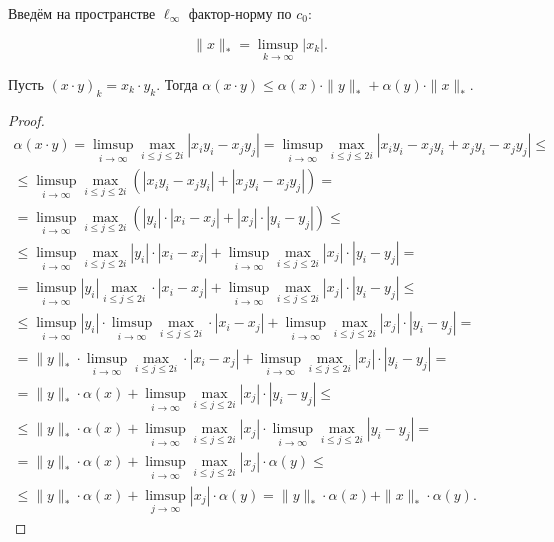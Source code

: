 Введём на пространстве $\ell_\infty$ фактор-норму по $c_0$:

\begin{equation}
	\|x\|_* = \limsup_{k\to\infty} |x_k|
	.
\end{equation}

\begin{theorem}
	\label{thm:alpha_xy}
	Пусть $(x\cdot y)_k = x_k\cdot y_k$.
	Тогда
	$\alpha(x\cdot y)\leq \alpha(x)\cdot \|y\|_* + \alpha(y)\cdot \|x\|_*$.
\end{theorem}

\begin{proof}
	\begin{multline}
		\alpha(x\cdot y)
		=
		\limsup_{i\to\infty} \max_{i\leq j \leq 2i} |x_i y_i - x_j y_j|
		=
		\limsup_{i\to\infty} \max_{i\leq j \leq 2i} |x_i y_i - x_j y_i + x_j y_i - x_j y_j|
		\leq
		\\ \leq
		\limsup_{i\to\infty} \max_{i\leq j \leq 2i} \left(|x_i y_i - x_j y_i| + |x_j y_i - x_j y_j| \right)
		=
		\\=
		\limsup_{i\to\infty} \max_{i\leq j \leq 2i} \left(|y_i|\cdot|x_i - x_j| + |x_j|\cdot|y_i - y_j| \right)
		\leq
		\\ \leq
		\limsup_{i\to\infty} \max_{i\leq j \leq 2i} |y_i|\cdot|x_i - x_j| + \limsup_{i\to\infty} \max_{i\leq j \leq 2i}|x_j|\cdot|y_i - y_j|
		=
		\\ =
		\limsup_{i\to\infty} |y_i| \max_{i\leq j \leq 2i} \cdot|x_i - x_j| + \limsup_{i\to\infty} \max_{i\leq j \leq 2i}|x_j|\cdot|y_i - y_j|
		\leq
		\\ \leq
		\limsup_{i\to\infty} |y_i| \cdot \limsup_{i\to\infty} \max_{i\leq j \leq 2i} \cdot|x_i - x_j| + \limsup_{i\to\infty} \max_{i\leq j \leq 2i}|x_j|\cdot|y_i - y_j|
		=
		\\ =
		\|y\|_* \cdot \limsup_{i\to\infty} \max_{i\leq j \leq 2i} \cdot|x_i - x_j| + \limsup_{i\to\infty} \max_{i\leq j \leq 2i}|x_j|\cdot|y_i - y_j|
		=
		\\ =
		\|y\|_* \cdot \alpha(x) + \limsup_{i\to\infty} \max_{i\leq j \leq 2i}|x_j|\cdot|y_i - y_j|
		\leq
		\\ \leq
		\|y\|_* \cdot \alpha(x) + \limsup_{i\to\infty} \max_{i\leq j \leq 2i}|x_j|\cdot\limsup_{i\to\infty} \max_{i\leq j \leq 2i}|y_i - y_j|
		=
		\\ =
		\|y\|_* \cdot \alpha(x) + \limsup_{i\to\infty} \max_{i\leq j \leq 2i}|x_j|\cdot \alpha(y)
		\leq
		\\ \leq
		\|y\|_* \cdot \alpha(x) + \limsup_{j\to\infty} |x_j|\cdot \alpha(y)
		=
		\|y\|_* \cdot \alpha(x) + \|x\|_* \cdot \alpha(y)
		.
	\end{multline}
\end{proof}

